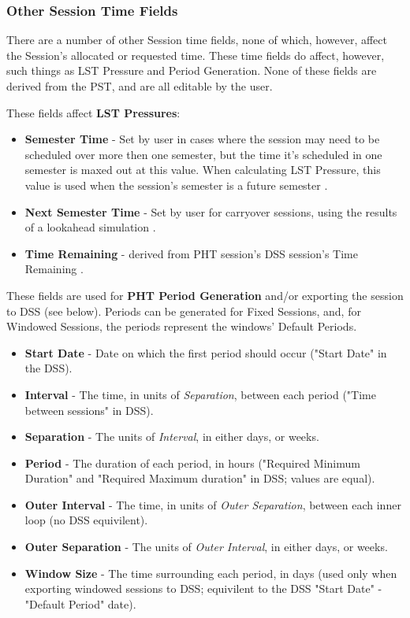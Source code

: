\documentclass{article}
\begin{document}
\subsubsection{Other Session Time Fields}

There are a number of other Session time fields, none of which, however, affect the Session's allocated or requested time.  These time fields do affect, however, such things as LST Pressure and Period Generation.  None of these fields are derived from the PST, and are all editable by the user.

These fields affect {\bf LST Pressures}:

\begin{itemize}
\item {\bf Semester Time } - Set by user in cases where the session may need to be scheduled over more then one semester, but the time it's scheduled in one semester is maxed out at this value.  When calculating LST Pressure, this value is used when the session's semester is a future semester \cite{marganian12a}.
\item {\bf Next Semester Time } - Set by user for carryover sessions, using the results of a lookahead simulation \cite{marganian12a}.
\item {\bf Time Remaining } - derived from PHT session's DSS session's Time Remaining \cite{marganian10a}.
\end{itemize}

These fields are used for {\bf PHT Period Generation} and/or exporting the session to DSS (see below).  Periods can be generated for Fixed Sessions, and, for Windowed Sessions, the periods represent the windows' Default Periods.

\begin{itemize}
\item {\bf Start Date } - Date on which the first period should occur ("Start Date" in the DSS). 
\item {\bf Interval  } - The time, in units of {\it Separation}, between each period ("Time between sessions" in DSS).
\item {\bf Separation } - The units of {\it Interval}, in either days, or weeks.
\item {\bf Period  } - The duration of each period, in hours ("Required Minimum Duration" and "Required Maximum duration" in DSS;  values are equal).  
\item {\bf Outer Interval } - The time, in units of {\it Outer Separation}, between each inner loop (no DSS equivilent). 
\item {\bf Outer Separation } - The units of {\it Outer Interval}, in either days, or weeks.
\item {\bf Window Size } - The time surrounding each period, in days (used only when exporting windowed sessions to DSS; equivilent to the DSS "Start Date" - "Default Period" date). 
\end{itemize}
\end{document}
